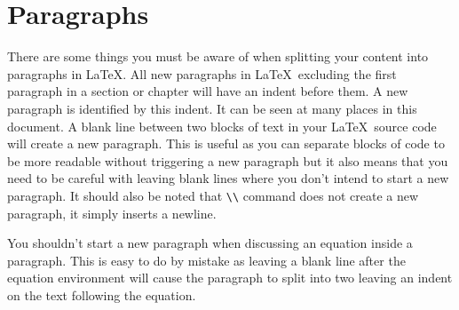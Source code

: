 	\section{Paragraphs}
	There are some things you must be aware of when splitting your content into paragraphs in \LaTeX. All new paragraphs in \LaTeX\ excluding the first paragraph in a section or chapter will have an indent before them. A new paragraph is identified by this indent. It can be seen at many places in this document. A blank line between two blocks of text in your \LaTeX\ source code will create a new paragraph. This is useful as you can separate blocks of code to be more readable without triggering a new paragraph but it also means that you need to be careful with leaving blank lines where you don't intend to start a new paragraph. It should also be noted that \verb*|\\| command does not create a new paragraph, it simply inserts a newline.

	{\reversemarginpar{}}You shouldn't start a new paragraph when discussing an equation inside a paragraph. This is easy to do by mistake as leaving a blank line after the equation environment will cause the paragraph to split into two leaving an indent on the text following the equation.
